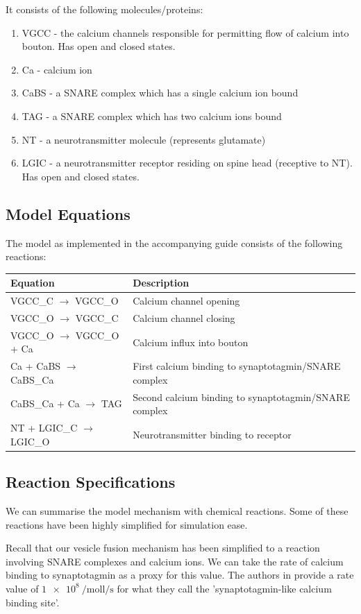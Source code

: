 \documentclass[a4paper]{article}
\begin{document}
It consists of the following molecules/proteins:
\begin{enumerate}
    \item VGCC - the calcium channels responsible for permitting flow of calcium into bouton. Has open and closed states.
    \item Ca - calcium ion
    \item CaBS - a SNARE complex which has a single calcium ion bound
    \item TAG - a SNARE complex which has two calcium ions bound
    \item NT - a neurotransmitter molecule (represents glutamate)
    \item LGIC - a neurotransmitter receptor residing on spine head (receptive to NT). Has open and closed states.
\end{enumerate}

\subsection{Model Equations}
The model as implemented in the accompanying guide consists of the following reactions:
\begin{table}[H]
\begin{tabular}{ll}
Equation & Description \\ \hline
VGCC\_C $\to$ VGCC\_O & Calcium channel opening \\
VGCC\_O $\to$ VGCC\_C & Calcium channel closing \\
VGCC\_O $\to$ VGCC\_O + Ca & Calcium influx into bouton \\
Ca + CaBS $\to$ CaBS\_Ca & First calcium binding to synaptotagmin/SNARE complex  \\ 
CaBS\_Ca + Ca $\to$ TAG & Second calcium binding to synaptotagmin/SNARE complex  \\
NT + LGIC\_C $\to$ LGIC\_O& Neurotransmitter binding to receptor \\
\end{tabular} 
\end{table}

\subsection{Reaction Specifications}
We can summarise the model mechanism with chemical reactions. Some of these reactions have been highly simplified for simulation ease.

Recall that our vesicle fusion mechanism has been simplified to a reaction involving SNARE complexes and calcium ions. We can take the rate of calcium binding to synaptotagmin as a proxy for this value. The authors in \cite{ma2014quantitative} provide a rate value of $\SI{1e8}{\per\mol\litre\per\second}$ for what they call the 'synaptotagmin-like calcium binding site'. 
\end{document}
